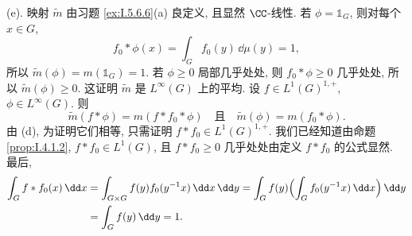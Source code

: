 \begin{solution}
(e). 映射 $\tilde{m}$ 由习题 \ref{ex:I.5.6.6}(a) 良定义, 且显然 $\CC$-线性. 若 $\phi = \mathbb{1}_G$, 则对每个 $x \in G$,
\[
f_0 * \phi(x) = \int_G f_0(y)\,\dd\mu(y) = 1,
\]
所以 $\tilde{m}(\phi) = m(\mathbb{1}_G) = 1$. 若 $\phi \geq 0$ 局部几乎处处, 则 $f_0 * \phi \geq 0$ 几乎处处, 所以 $\tilde{m}(\phi) \geq 0$. 这证明 $\tilde{m}$ 是 $L^{\infty}(G)$ 上的平均.
设 $f \in L^1(G)^{1,+}$, $\phi \in L^{\infty}(G)$. 则
\[
\tilde{m}(f * \phi) = m(f * f_0 * \phi) \quad \text{且} \quad \tilde{m}(\phi) = m(f_0 * \phi).
\]
由 (d), 为证明它们相等, 只需证明 $f * f_0 \in L^1(G)^{1,+}$. 我们已经知道由命题 \ref{prop:I.4.1.2}, $f * f_0 \in L^1(G)$, 且 $f * f_0 \geq 0$ 几乎处处由定义 $f * f_0$ 的公式显然. 最后,
\begin{align*}
\int_G f * f_0(x)\,\dd x &= \int_{G \times G}f(y)f_0(y^{-1}x)\,\dd x\,\dd y = \int_G f(y)\Bigl(\int_G f_0(y^{-1}x)\,\dd x\Bigr)\,\dd y \\
&= \int_G f(y)\,\dd y = 1.
\end{align*}


\end{solution}
